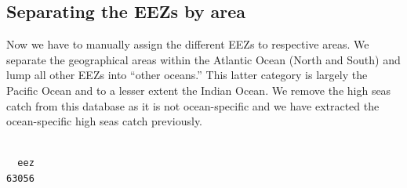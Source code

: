 \documentclass[
]{article}
\newenvironment{Shaded}{\begin{snugshade}}{\end{snugshade}}
\newcommand{\CommentTok}[1]{\textcolor[rgb]{0.37,0.37,0.37}{#1}}
\newcommand{\FunctionTok}[1]{\textcolor[rgb]{0.28,0.35,0.67}{#1}}
\newcommand{\NormalTok}[1]{\textcolor[rgb]{0.00,0.23,0.31}{#1}}
\newcommand{\OtherTok}[1]{\textcolor[rgb]{0.00,0.23,0.31}{#1}}
\newcommand{\SpecialCharTok}[1]{\textcolor[rgb]{0.37,0.37,0.37}{#1}}
\newcommand{\StringTok}[1]{\textcolor[rgb]{0.13,0.47,0.30}{#1}}
\begin{document}
\subsection{Separating the EEZs by
area}\label{separating-the-eezs-by-area}

Now we have to manually assign the different EEZs to respective areas.
We separate the geographical areas within the Atlantic Ocean (North and
South) and lump all other EEZs into ``other oceans.'' This latter
category is largely the Pacific Ocean and to a lesser extent the Indian
Ocean. We remove the high seas catch from this database as it is not
ocean-specific and we have extracted the ocean-specific high seas catch
previously.

\begin{Shaded}
\end{Shaded}

\begin{verbatim}

  eez 
63056 
\end{verbatim}
\end{document}
